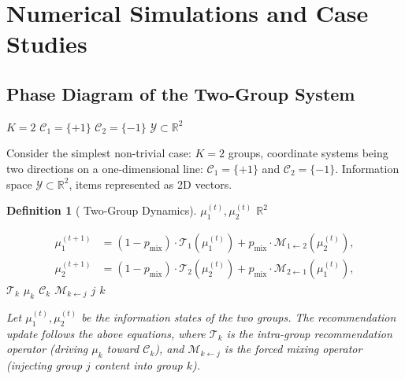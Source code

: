 \documentclass[11pt,a4paper]{article}
\newtheorem{definition}[theorem]{Definition}
\theoremstyle{remark}
\newcommand{\R}{\mathbb{R}}
\newcommand{\Y}{\mathcal{Y}}
\newcommand{\CoordSys}{\mathcal{C}}
\begin{document}
\section{}
\section{Numerical Simulations and Case Studies}

\subsection{}

\subsection{Phase Diagram of the Two-Group System}

$K=2$ 
$\CoordSys_1 = \{+1\}$  $\CoordSys_2 = \{-1\}$
 $\Y \subset \R^2$

Consider the simplest non-trivial case: $K=2$ groups, coordinate systems being two
directions on a one-dimensional line: $\CoordSys_1 = \{+1\}$ and $\CoordSys_2 = \{-1\}$.
Information space $\Y \subset \R^2$, items represented as 2D vectors.

\begin{definition}[ Two-Group Dynamics]
 $\mu_1^{(t)}, \mu_2^{(t)}$ $\R^2$ 

\begin{align}
\mu_1^{(t+1)} &= (1-p_{\text{mix}}) \cdot \mathcal{T}_1(\mu_1^{(t)}) +
p_{\text{mix}} \cdot \mathcal{M}_{1 \leftarrow 2}(\mu_2^{(t)}), \\
\mu_2^{(t+1)} &= (1-p_{\text{mix}}) \cdot \mathcal{T}_2(\mu_2^{(t)}) +
p_{\text{mix}} \cdot \mathcal{M}_{2 \leftarrow 1}(\mu_1^{(t)}),
\end{align}
 $\mathcal{T}_k$  $\mu_k$  $\CoordSys_k$
$\mathcal{M}_{k \leftarrow j}$  $j$  $k$

Let $\mu_1^{(t)}, \mu_2^{(t)}$ be the information states of the two groups. The
recommendation update follows the above equations, where $\mathcal{T}_k$ is the
intra-group recommendation operator (driving $\mu_k$ toward $\CoordSys_k$), and
$\mathcal{M}_{k \leftarrow j}$ is the forced mixing operator (injecting group $j$
content into group $k$).
\end{definition}
\end{document}
